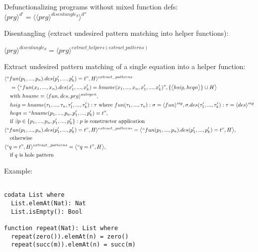 \documentclass[11pt]{article} %
\begin{document}
Defunctionalizing programs without mixed function defs: $\langle prg \rangle^{d'} = \langle \langle prg \rangle^{disentangle_d} \rangle^{d''}$

Disentangling (extract undesired pattern matching into helper functions):

$\langle prg \rangle^{disentangle_d} = \langle prg \rangle^{extract\_helpers(extract\_patterns)}$

Extract undesired pattern matching of a single equation into a helper function:
\begin{alignat*}{3}
&\langle `` fun(p_1, ..., p_n).des(p'_1, ..., p'_k) = t ", H \rangle^{extract\_patterns} \\
&\quad = \big\langle `` fun(x_1, ..., x_n).des(x'_1, ..., x'_k) = hname(x_1, ..., x_n, x'_1, ..., x'_k) ", \{\big\langle hsig, heqn \big\rangle\} \cup H \big\rangle \\
&\quad \textrm{with } hname= \langle fun, des, prg \rangle^{autogen}, \\
&\quad hsig = hname(\tau_1, ..., \tau_n, \tau'_1, ..., \tau'_k): \tau \textrm{ where } fun(\tau_1, ..., \tau_n): \sigma = \langle fun \rangle^{sig}, \sigma.des(\tau'_1, ..., \tau'_k): \tau = \langle des \rangle^{sig} \\
&\quad heqn = `` hname(p_1, ..., p_n, p'_1, ..., p'_k) = t ", \\
&\quad \textrm{if } \exists p \in \{p_1, ..., p_n, p'_1, ..., p'_k\}: p \textrm{ is constructor application} \\
&\langle `` fun(p_1, ..., p_n).des(p'_1, ..., p'_k) = t ", H \rangle^{extract\_patterns} = \big\langle `` fun(p_1, ..., p_n).des(p'_1, ..., p'_k) = t ", H \big\rangle, \\
&\quad \textrm{otherwise} \\
&\langle `` q = t ", H \rangle^{extract\_patterns} = \big\langle `` q = t ", H \big\rangle, \\
&\quad \textrm{if $q$ is hole pattern}
\end{alignat*}

Example:

\begin{lstlisting}

codata List where
  List.elemAt(Nat): Nat
  List.isEmpty(): Bool

function repeat(Nat): List where
  repeat(zero()).elemAt(n) = zero()
  repeat(succ(m)).elemAt(n) = succ(m)

\end{lstlisting}
\end{document}
